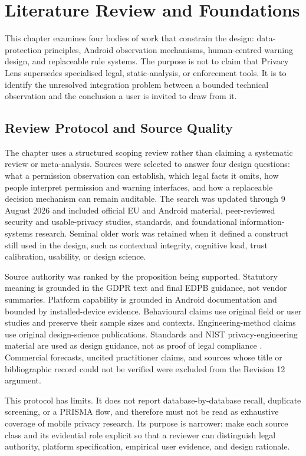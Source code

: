 \section{Literature Review and Foundations}

This chapter examines four bodies of work that constrain the design: data-protection principles, Android observation mechanisms, human-centred warning design, and replaceable rule systems. The purpose is not to claim that Privacy Lens supersedes specialised legal, static-analysis, or enforcement tools. It is to identify the unresolved integration problem between a bounded technical observation and the conclusion a user is invited to draw from it.

\subsection{Review Protocol and Source Quality}

The chapter uses a structured scoping review rather than claiming a systematic review or meta-analysis. Sources were selected to answer four design questions: what a permission observation can establish, which legal facts it omits, how people interpret permission and warning interfaces, and how a replaceable decision mechanism can remain auditable. The search was updated through 9 August 2026 and included official EU and Android material, peer-reviewed security and usable-privacy studies, standards, and foundational information-systems research. Seminal older work was retained when it defined a construct still used in the design, such as contextual integrity, cognitive load, trust calibration, usability, or design science.

Source authority was ranked by the proposition being supported. Statutory meaning is grounded in the GDPR text and final EDPB guidance, not vendor summaries. Platform capability is grounded in Android documentation and bounded by installed-device evidence. Behavioural claims use original field or user studies and preserve their sample sizes and contexts. Engineering-method claims use original design-science publications. Standards and NIST privacy-engineering material are used as design guidance, not as proof of legal compliance \cite{nist8062,nistprivacy2020}. Commercial forecasts, uncited practitioner claims, and sources whose title or bibliographic record could not be verified were excluded from the Revision 12 argument.

This protocol has limits. It does not report database-by-database recall, duplicate screening, or a PRISMA flow, and therefore must not be read as exhaustive coverage of mobile privacy research. Its purpose is narrower: make each source class and its evidential role explicit so that a reviewer can distinguish legal authority, platform specification, empirical user evidence, and design rationale.

